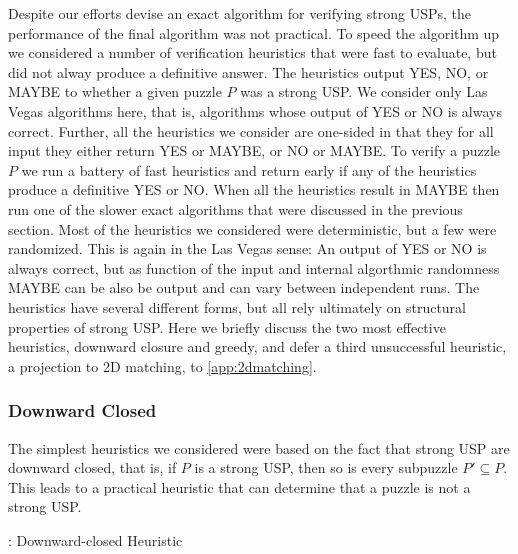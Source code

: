 \documentclass[11pt]{article}
\newcommand\sse{\subseteq}
\begin{document}
Despite our efforts devise an exact algorithm for verifying strong
USPs, the performance of the final algorithm was not practical.  To
speed the algorithm up we considered a number of verification
heuristics that were fast to evaluate, but did not alway produce a
definitive answer.  The heuristics output YES, NO, or MAYBE to whether
a given puzzle $P$ was a strong USP.  We consider only Las Vegas
algorithms here, that is, algorithms whose output of YES or NO is
always correct.  Further, all the heuristics we consider are one-sided
in that they for all input they either return YES or MAYBE, or NO or
MAYBE.  To verify a puzzle $P$ we run a battery of fast heuristics and
return early if any of the heuristics produce a definitive YES or NO.
When all the heuristics result in MAYBE then run one of the slower
exact algorithms that were discussed in the previous section.  Most of
the heuristics we considered were deterministic, but a few were
randomized.  This is again in the Las Vegas sense: An output of YES or
NO is always correct, but as function of the input and internal
algorthmic randomness MAYBE can be also be output and can vary between
independent runs.  The heuristics have several different forms, but
all rely ultimately on structural properties of strong USP.  Here we
briefly discuss the two most effective heuristics, downward closure
and greedy, and defer a third unsuccessful heuristic, a projection to
2D matching, to \autoref{app:2dmatching}.

\subsubsection{Downward Closed}

The simplest heuristics we considered were based on the fact that
strong USP are downward closed, that is, if $P$ is a strong USP, then
so is every subpuzzle $P' \sse P$.  This leads to a practical heuristic
that can determine that a puzzle is not a strong USP.

\begin{algorithm}[t]
  \caption{: Downward-closed Heuristic}
  \label{alg:downward-closed}
\begin{algorithmic}[1]
  \For{$P' \sse P, |P'| = s'$}
        \EndIf
  \EndFor{}
  \EndFunction
\end{algorithmic}
\end{algorithm}
\end{document}
